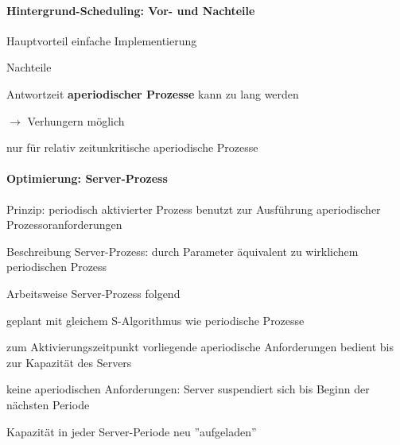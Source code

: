 \documentclass[a4paper]{article}
\begin{document}
\begin{multicols}{3}
    \paragraph{Hintergrund-Scheduling: Vor- und Nachteile}
    \begin{itemize*}
        \item Hauptvorteil einfache Implementierung
        \item Nachteile
        \begin{itemize*}
            \item Antwortzeit \textbf{aperiodischer Prozesse} kann zu lang werden
            \item[$\rightarrow$] Verhungern möglich
            \item nur für relativ zeitunkritische aperiodische Prozesse
        \end{itemize*}
    \end{itemize*}

    \paragraph{Optimierung: Server-Prozess}
    \begin{itemize*}
        \item Prinzip: periodisch aktivierter Prozess benutzt zur Ausführung aperiodischer Prozessoranforderungen
        \item Beschreibung Server-Prozess: durch Parameter äquivalent zu wirklichem periodischen Prozess
        \item Arbeitsweise Server-Prozess folgend
        \item geplant mit gleichem S-Algorithmus wie periodische Prozesse
        \item zum Aktivierungszeitpunkt vorliegende aperiodische Anforderungen bedient bis zur Kapazität des Servers
        \item keine aperiodischen Anforderungen: Server suspendiert sich bis Beginn der nächsten Periode %
        \item Kapazität in jeder Server-Periode neu ''aufgeladen''
    \end{itemize*}


\end{multicols}
\end{document}
